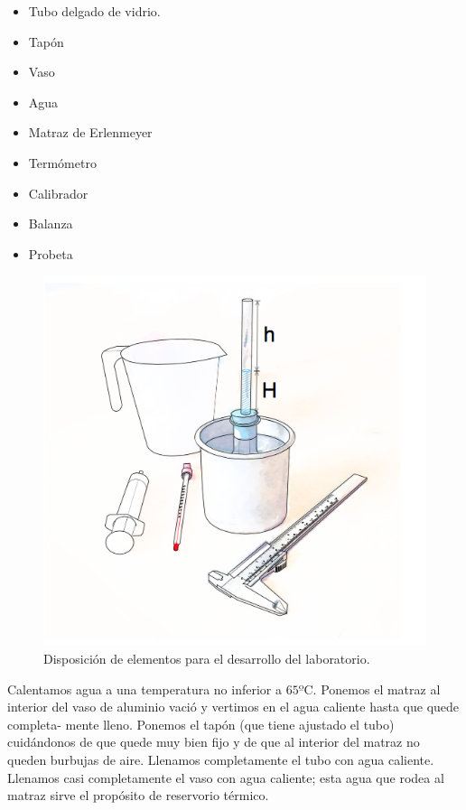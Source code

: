 \documentclass[DIV=calc, paper=a4, fontsize=11pt, twocolumn, spanish]{scrartcl}	 %
\begin{document}
\begin{itemize}
\item Tubo delgado de vidrio.
\item Tapón
\item Vaso
\item Agua
\item Matraz de Erlenmeyer
\item Termómetro
\item Calibrador
\item Balanza
\item Probeta
\end{itemize}

\begin{figure}[htbp]
\centering
	\includegraphics[scale=0.6]{data/img/figure02}
	\caption{Disposición de elementos para el desarrollo del laboratorio.}
\end{figure}

Calentamos agua a una temperatura no inferior a $65º$C. Ponemos el matraz al interior del vaso de aluminio vació y vertimos en el agua caliente hasta que quede completa- mente lleno. Ponemos el tapón (que tiene ajustado el tubo) cuidándonos de que quede muy bien fijo y de que al interior del matraz no queden burbujas de aire. Llenamos completamente el tubo con agua caliente. Llenamos casi completamente el vaso con agua caliente; esta agua que rodea al matraz sirve el propósito de reservorio térmico.\\
\end{document}
